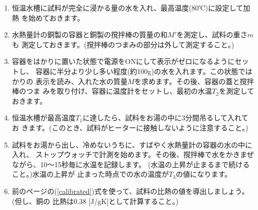 \begin{enumerate}

\item 恒温水槽に試料が完全に浸かる量の水を入れ、最高温度(80℃)に設定して加熱 
を始めておきます。

\item 水熱量計の銅製の容器と銅製の撹拌棒の質量の和$M'$を測定し、試料の重さ$m$も 
測定しておきます。(撹拌棒のつまみの部分は外して測定すること。)

\item 容器をはかりに置いた状態で電源をONにして表示がゼロになるようにセットし、 
容器に半分より少し多い程度(約100g)の水を入れます。この状態ではかりの 
表示を読み、入れた水の質量$M$を求めます。その後、容器の蓋と撹拌棒のつま 
みを取り付け、容器に温度計をセットし、最初の水温$T_2$を測定しておきます。

\item 恒温水槽が最高温度$T_1$に達したら、試料をお湯の中に3分間吊るして入れてお 
きます。(このとき、試料がヒーターに接触しないように注意すること。)

\item 試料をお湯から出し、冷めないうちに、すばやく水熱量計の容器の水の中に入れ、 
ストップウォッチで計測を始めます。その後、撹拌棒で水をかきまぜながら、10〜15秒毎に水温を記録します。
(水温の上昇が止まるまで続けること。)水温の上昇が 
止まった時点での水の温度が$T_3$の値になります。

\item 前のページの(\ref{calibrated})式を使って、試料の比熱の値を導出しましょう。(但し、銅の 
比熱は0.38 [J/gK]として計算すること。)

\end{enumerate}



